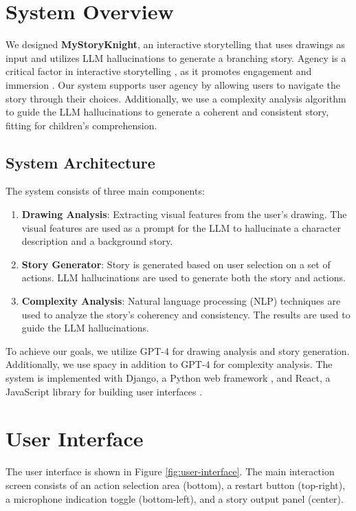 \documentclass[submit,techrep,english]{ipsj}
\begin{document}
\section{System Overview}
\label{sec:system-overview}
We designed \textbf{MyStoryKnight}, an interactive storytelling that uses drawings as input and utilizes LLM hallucinations to generate a branching story. Agency is a critical factor in interactive storytelling \cite{11:LimaGV20}, as it promotes engagement and immersion \cite{12:ZhangXWYRWYWL22}. Our system supports user agency by allowing users to navigate the story through their choices. Additionally, we use a complexity analysis algorithm to guide the LLM hallucinations to generate a coherent and consistent story, fitting for children's comprehension.

\subsection{System Architecture}
\label{subsec:system-architecture}
The system consists of three main components:
\begin{enumerate}
    \item \textbf{Drawing Analysis}: Extracting visual features from the user's drawing. The visual features are used as a prompt for the LLM to hallucinate a character description and a background story.
    \item \textbf{Story Generator}: Story is generated based on user selection on a set of actions. LLM hallucinations are used to generate both the story and actions.
    \item \textbf{Complexity Analysis}: Natural language processing (NLP) techniques are used to analyze the story's coherency and consistency. The results are used to guide the LLM hallucinations.
\end{enumerate}
To achieve our goals, we utilize GPT-4 \cite{17:abs-2303-08774} for drawing analysis and story generation. Additionally, we use spacy \cite{18:spacy} in addition to GPT-4 for complexity analysis. The system is implemented with Django, a Python web framework \cite{19:django}, and React, a JavaScript library for building user interfaces \cite{20:react}.

\section{User Interface}
\label{sec:user-interface}

The user interface is shown in Figure \ref{fig:user-interface}. The main interaction screen consists of an action selection area (bottom), a restart button (top-right), a microphone indication toggle (bottom-left), and a story output panel (center).
\end{document}
